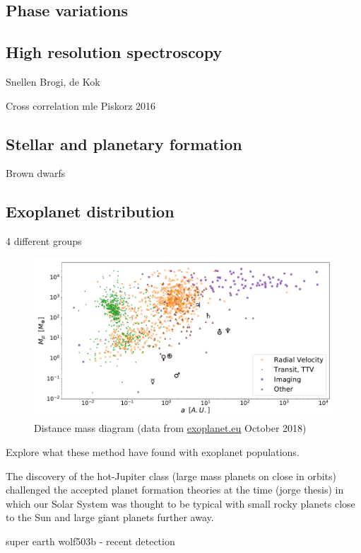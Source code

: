 \subsection{Phase variations}

\subsection{High resolution spectroscopy}
Snellen  Brogi, de Kok

Cross correlation mle  Piskorz 2016


\subsection{Stellar and planetary formation}

Brown dwarfs

\subsection{Exoplanet distribution} 4 different groups

\fref{}


\begin{figure}
    \centering
    \includegraphics[width=0.7\linewidth]{./figures/introduction/exoplanetEU_a_mass.pdf}
    \caption{Distance mass diagram (data from \href{http://ww.exoplanet.eu}{exoplanet.eu} October 2018)}
    \label{fig:pltoverlayadd}
\end{figure}


Explore what these method have found with exoplanet populations.

The discovery of the hot-Jupiter class (large mass planets on close in orbits) challenged the accepted planet formation theories at the time \citep[.e.g][]{pollack_formation_1996}(jorge thesis) in which our Solar System was thought to be typical with small rocky planets close to the Sun and large giant planets further away.


super earth wolf503b - recent detection


